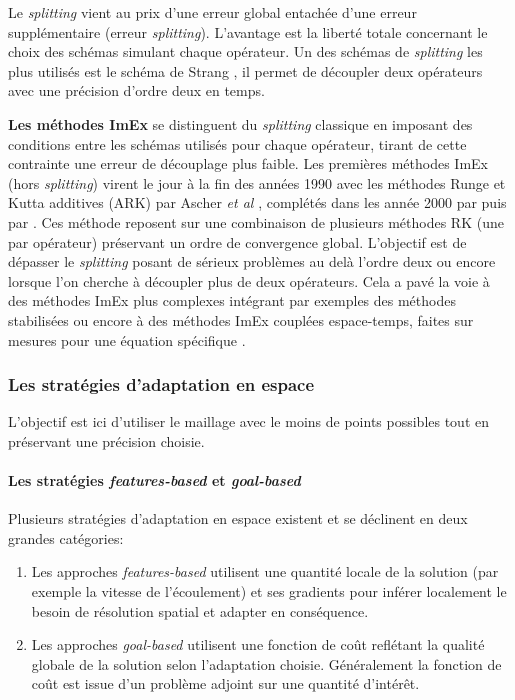         Le \textit{splitting} vient au prix d'une erreur global entachée d'une erreur supplémentaire (erreur \textit{splitting}).
        L'avantage est la liberté totale concernant le choix des schémas simulant chaque opérateur.
        Un des schémas de \textit{splitting} les plus utilisés est le schéma de Strang \cite{Strang1968}, 
        il permet de découpler deux opérateurs avec une précision d'ordre deux en temps.\par
        \textbf{Les méthodes ImEx} se distinguent du \textit{splitting} classique en imposant des conditions entre les schémas utilisés pour chaque opérateur, 
        tirant de cette contrainte une erreur de découplage plus faible.
        Les premières méthodes ImEx (hors \textit{splitting}) virent le jour à la fin des années 1990 
        avec les méthodes Runge et Kutta additives (ARK) par Ascher \textit{et al} \cite{ASCHER1997151},
        complétés dans les année 2000 par \cite{KENNEDY2003139} puis par \cite{pareschi2010implicitexplicitrungekuttaschemesapplications}.
        Ces méthode reposent sur une combinaison de plusieurs méthodes RK (une par opérateur) préservant un ordre de convergence global.
        L'objectif est de dépasser le \textit{splitting} posant de sérieux problèmes au delà l'ordre deux ou encore lorsque l'on cherche à découpler plus de deux opérateurs.
        Cela a pavé la voie à des méthodes ImEx plus complexes intégrant par exemples des méthodes stabilisées \cite{Abdulle2013} 
        ou encore à des méthodes ImEx couplées espace-temps, faites sur mesures pour une équation spécifique \cite{rebou2024}.
    \subsubsection{Les stratégies d'adaptation en espace}
        L'objectif est ici d'utiliser le maillage avec le moins de points possibles tout en préservant une précision choisie.
        \paragraph{Les stratégies \textit{features-based} et \textit{goal-based}}
        Plusieurs stratégies d'adaptation en espace existent et se déclinent en deux grandes catégories\cite{Vivarelli2025Fluids}:
        \begin{enumerate}
            \item Les approches \textit{features-based} utilisent une quantité locale de la solution (par exemple la vitesse de l'écoulement) 
            et ses gradients pour inférer localement le besoin de résolution spatial et adapter en conséquence.
            \item Les approches \textit{goal-based} utilisent une fonction de coût reflétant la qualité globale de la solution selon l'adaptation choisie.
            Généralement la fonction de coût est issue d'un problème adjoint sur une quantité d'intérêt.
        \end{enumerate}
